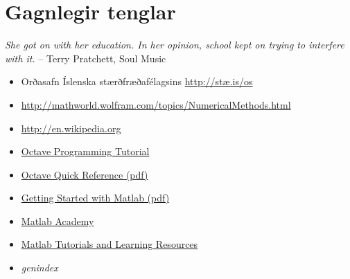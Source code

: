 \documentclass[A4paper,10pt,icelandic]{sphinxmanual}
\begin{document}
\section{Gagnlegir tenglar}
\label{vidauki:gagnlegir-tenglar}
\emph{She got on with her education. In her opinion, school kept on trying to interfere with it.}
-- Terry Pratchett, Soul Music
\begin{itemize}
\item {} 
Orðasafn Íslenska stærðfræðafélagsins \href{http://stae.is/os}{http://stæ.is/os}

\item {} 
\href{http://mathworld.wolfram.com/topics/NumericalMethods.html}{http://mathworld.wolfram.com/topics/NumericalMethods.html}

\item {} 
\href{http://en.wikipedia.org}{http://en.wikipedia.org}

\item {} 
\href{https://en.wikibooks.org/wiki/Octave\_Programming\_Tutorial}{Octave Programming Tutorial}

\item {} 
\href{http://www.lehman.edu/academics/cmacs/documents/refcard-a4.pdf}{Octave Quick Reference (pdf)}

\item {} 
\href{http://se.mathworks.com/help/pdf\_doc/matlab/getstart.pdf?s\_tid=int\_tut}{Getting Started with Matlab (pdf)}

\item {} 
\href{https://matlabacademy.mathworks.com/R2015b/}{Matlab Academy}

\item {} 
\href{http://se.mathworks.com/academia/student\_center/tutorials/launchpad.html}{Matlab Tutorials and Learning Resources}

\end{itemize}
\begin{itemize}
\item {} 
\emph{genindex}

\end{itemize}


\renewcommand{\indexname}{Atriðaskrá}
\printindex
\end{document}
